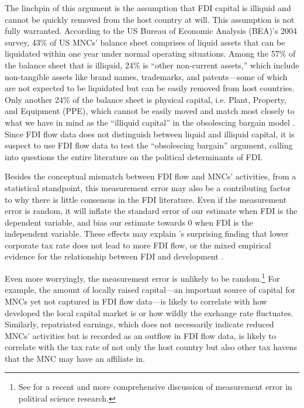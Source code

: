The linchpin of this argument is the assumption that FDI capital is illiquid and
cannot be quickly removed from the host country at will. This assumption is not
fully warranted. According to the US Bureau of Economic Analysis (BEA)'s 2004
survey, 43\% of US MNCs' balance sheet comprises of liquid assets that can be
liquidated within one year under normal operating situations. Among the 57\% of
the balance sheet that is illiquid, 24\% is ``other non-current assets,'' which
include non-tangible assets like brand names, trademarks, and patents---some of
which are not expected to be liquidated but can be easily removed from host
countries. Only another 24\% of the balance sheet is physical capital, i.e.
Plant, Property, and Equipment (PPE), which cannot be easily moved and match
most closely to what we have in mind as the ``illiquid capital'' in the
obsolescing bargain model \citep[113]{Kerner2014a}. Since FDI flow data does not
distinguish between liquid and illiquid capital, it is suspect to use FDI flow
data to test the ``obsolescing bargain'' argument, calling into questions the
entire literature on the political determinants of FDI.

Besides the conceptual mismatch between FDI flow and MNCs' activities, from a
statistical standpoint, this measurement error may also be a contributing factor
to why there is little consensus in the FDI literature. Even if the measurement
error is random, it will inflate the standard error of our estimate when FDI is
the dependent variable, and bias our estimate towards 0 when FDI is the
independent variable. These effects may explain \citet{Jensen2012}'s surprising
finding that lower corporate tax rate does not lead to more FDI flow, or the
mixed empirical evidence for the relationship between FDI and development
\citep[108]{Mold2004}.

Even more worryingly, the measurement error is unlikely to be
random.\footnote{See \citet{Gallop2017} for a recent and more comprehensive
  discussion of measurement error in political science research.} For example,
the amount of locally raised capital---an important source of capital for MNCs
yet not captured in FDI flow data---is likely to correlate with how developed
the local capital market is or how wildly the exchange rate fluctuates.
Similarly, repatriated earnings, which does not necessarily indicate reduced
MNCs' activities but is recorded as an outflow in FDI flow data, is likely to
correlate with the tax rate of not only the host country but also other tax
havens that the MNC may have an affiliate in.

